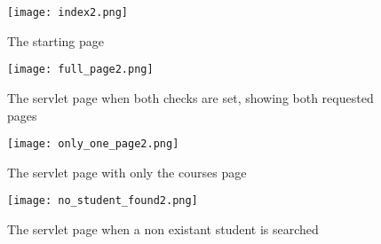 \begin{figure}[H]
  \centering
  \texttt{[image: index2.png]}
  \caption{The starting page}
\end{figure}

\begin{figure}[H]
  \centering
  \texttt{[image: full\_page2.png]}
  \caption{The servlet page when both checks are set, showing both requested pages}
\end{figure}

\begin{figure}[H]
  \centering
  \texttt{[image: only\_one\_page2.png]}
  \caption{The servlet page with only the courses page}
\end{figure}

\begin{figure}[H]
  \centering
  \texttt{[image: no\_student\_found2.png]}
  \caption{The servlet page when a non existant student is searched}
\end{figure}